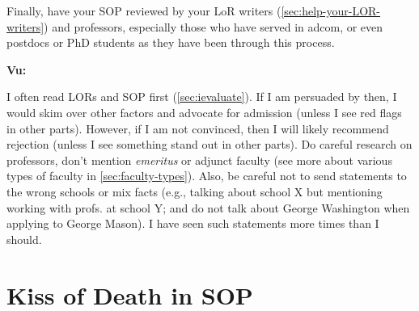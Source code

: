 \documentclass[oneside,11pt,dvipsnames]{book}
\newenvironment{commentbox}[1][]{
  \small
  \begin{mybox}
    {\small \textbf{#1}}
  }{
  \end{mybox}
}
\begin{document}
Finally, have your SOP reviewed by your LoR writers (\autoref{sec:help-your-LOR-writers}) and professors, especially those who have served in adcom, or even postdocs or PhD students as they have been through this process.

\begin{commentbox}[Vu:]
  I often read LORs and SOP first (\autoref{sec:ievaluate}). If I am
  persuaded by then, I would skim over other factors and advocate for
  admission (unless I see red flags in other parts). However, if I am not
  convinced, then I will likely recommend rejection (unless I see
  something stand out in other parts).
  \tcblower
  Do careful research on professors, don't mention \emph{emeritus} or adjunct faculty (see more about various types of faculty in \autoref{sec:faculty-types}).
  Also, be careful not to send statements to the wrong schools or mix
  facts (e.g., talking about school X but mentioning working with
  profs. at school Y; and do not talk about George Washington when applying to George Mason). I have seen such statements more times than I should.
\end{commentbox}


\section{Kiss of Death in SOP} \label{sec:kiss-of-death-sop}
\end{document}
